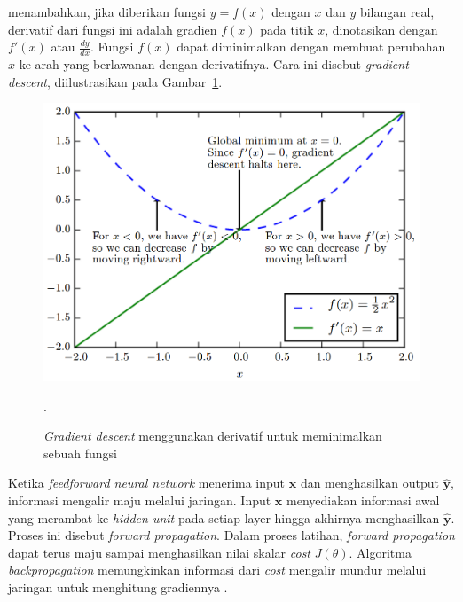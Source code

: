 \citeauthor{goodfellow-2016} menambahkan, jika diberikan fungsi $y = f(x)$ dengan $x$ dan $y$ bilangan real, derivatif dari fungsi ini adalah gradien $f(x)$ pada titik $x$, dinotasikan dengan $f'(x)$ atau $\frac{dy}{dx}$. Fungsi $f(x)$ dapat diminimalkan dengan membuat perubahan $x$ ke arah yang berlawanan dengan derivatifnya. Cara ini disebut \textit{gradient descent}, diilustrasikan pada Gambar~\ref{gambar:gradient-descent}.

\begin{figure}
    \centering
    \includegraphics[width=12cm]{gambar/landasan-teori/gradient-descent.png}
    \caption{\textit{Gradient descent} menggunakan derivatif untuk meminimalkan sebuah fungsi \citep{goodfellow-2016}}.
    \label{gambar:gradient-descent}
\end{figure}

Ketika \textit{feedforward neural network} menerima input $\pmb{x}$ dan menghasilkan output $\pmb{\hat{y}}$, informasi mengalir maju melalui jaringan. Input $\pmb{x}$ menyediakan informasi awal yang merambat ke \textit{hidden unit} pada setiap layer hingga akhirnya menghasilkan $\pmb{\hat{y}}$. Proses ini disebut \textit{forward propagation}. Dalam proses latihan, \textit{forward propagation} dapat terus maju sampai menghasilkan nilai skalar \textit{cost} $J(\theta)$. Algoritma \textit{backpropagation} memungkinkan informasi dari \textit{cost} mengalir mundur melalui jaringan untuk menghitung gradiennya \citep{goodfellow-2016}.


